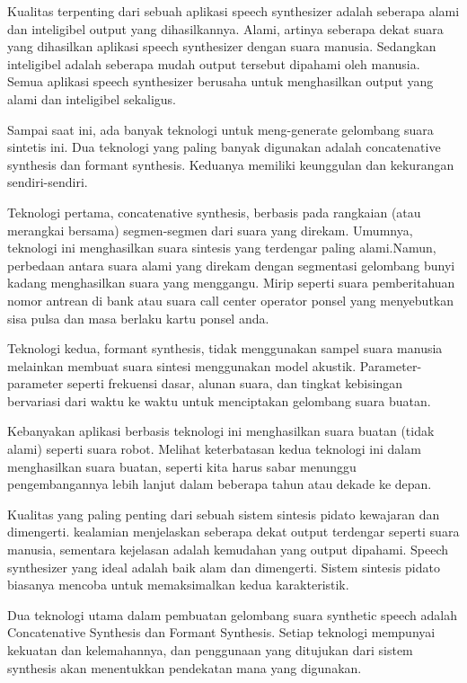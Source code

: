 Kualitas terpenting dari sebuah aplikasi speech synthesizer adalah seberapa alami dan inteligibel output yang dihasilkannya. Alami, artinya seberapa dekat suara yang dihasilkan aplikasi speech synthesizer dengan suara manusia. Sedangkan inteligibel adalah seberapa mudah output tersebut dipahami oleh manusia. Semua aplikasi speech synthesizer berusaha untuk menghasilkan output yang alami dan inteligibel sekaligus.

Sampai saat ini, ada banyak teknologi untuk meng-generate gelombang suara sintetis ini. Dua teknologi yang paling banyak digunakan adalah concatenative synthesis dan formant synthesis. Keduanya memiliki keunggulan dan kekurangan sendiri-sendiri.

Teknologi pertama, concatenative synthesis, berbasis pada rangkaian (atau merangkai bersama) segmen-segmen dari suara yang direkam. Umumnya, teknologi ini menghasilkan suara sintesis yang terdengar paling alami.Namun, perbedaan antara suara alami yang direkam dengan segmentasi gelombang bunyi kadang menghasilkan suara yang menggangu. Mirip seperti suara pemberitahuan nomor antrean di bank atau suara call center operator ponsel yang menyebutkan sisa pulsa dan masa berlaku kartu ponsel anda.

Teknologi kedua, formant synthesis, tidak menggunakan sampel suara manusia melainkan membuat suara sintesi menggunakan model akustik. Parameter-parameter seperti frekuensi dasar, alunan suara, dan tingkat kebisingan bervariasi dari waktu ke waktu untuk menciptakan gelombang suara buatan.

Kebanyakan aplikasi berbasis teknologi ini menghasilkan suara buatan (tidak alami) seperti suara robot. Melihat keterbatasan kedua teknologi ini dalam menghasilkan suara buatan, seperti kita harus sabar menunggu pengembangannya lebih lanjut dalam beberapa tahun atau dekade ke depan.

Kualitas yang paling penting dari sebuah sistem sintesis pidato kewajaran dan dimengerti. kealamian menjelaskan seberapa dekat output terdengar seperti suara manusia, sementara kejelasan adalah kemudahan yang output dipahami. Speech synthesizer yang ideal adalah baik alam dan dimengerti. Sistem sintesis pidato biasanya mencoba untuk memaksimalkan kedua karakteristik.

Dua teknologi utama dalam pembuatan gelombang suara synthetic speech adalah Concatenative Synthesis dan Formant Synthesis. Setiap teknologi mempunyai kekuatan dan kelemahannya, dan penggunaan yang ditujukan dari sistem synthesis akan menentukkan pendekatan mana yang digunakan.

